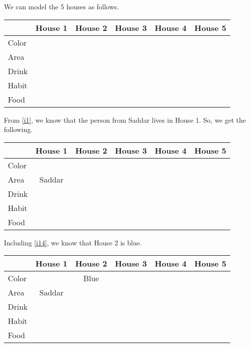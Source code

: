 \documentclass[a4paper]{exam}
\newcommand\cb{\color{blue}}
\begin{document}
\begin{questions}
  \begin{solution}
    We can model the 5 houses as follows.
    
    \begin{tabular}{l||*5{c|}}
      & \textbf{House 1} & \textbf{House 2} & \textbf{House 3} & \textbf{House 4} & \textbf{House 5} \\
      \hline\hline
      Color & & & & & \\\hline
      Area & & & & & \\\hline
      Drink & & & & & \\\hline
      Habit & & & & & \\\hline
      Food & & & & & \\\hline
    \end{tabular}

    From \ref{i1}, we know that the person from Saddar lives in House 1. So, we get the following.\\
    \begin{tabular}{l||*5{c|}}
      & \textbf{House 1} & \textbf{House 2} & \textbf{House 3} & \textbf{House 4} & \textbf{House 5} \\
      \hline\hline
      Color & & & & & \\\hline
      Area & Saddar & & & & \\\hline
      Drink & & & & & \\\hline
      Habit & & & & & \\\hline
      Food & & & & & \\\hline
    \end{tabular}

    Including \ref{i14}, we know that House 2 is blue.\\
    \begin{tabular}{l||*5{c|}}
      & \textbf{House 1} & \textbf{\cb House 2} & \textbf{House 3} & \textbf{House 4} & \textbf{House 5} \\
      \hline\hline
      Color & & Blue & & & \\\hline
      Area & Saddar & & & & \\\hline
      Drink & & & & & \\\hline
      Habit & & & & & \\\hline
      Food & & & & & \\\hline
    \end{tabular}
  \end{solution}
  
\end{questions}
\end{document}
